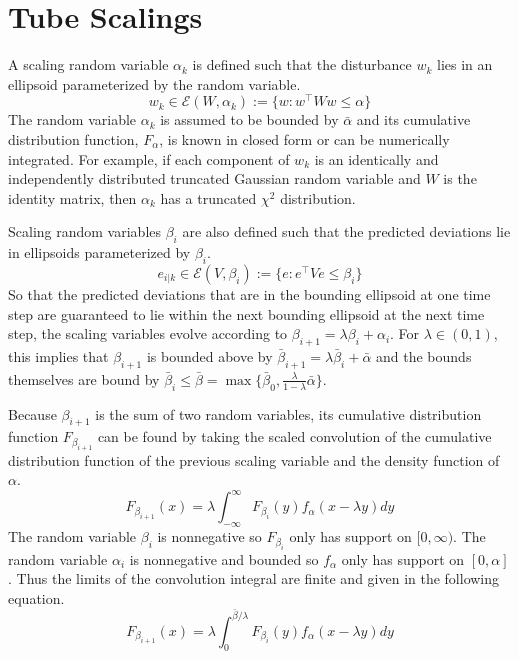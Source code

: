 \documentclass[12 pt]{report}
\begin{document}
\section{Tube Scalings}

A scaling random variable $\alpha_k$ is defined such that the disturbance $w_k$ lies in an ellipsoid parameterized by the random variable. $$w_k \in \mathcal{E}(W, \alpha_k) := \{w: w^\top Ww \leq \alpha\}$$ The random variable $\alpha_k$ is assumed to be bounded by $\bar{\alpha}$ and its cumulative distribution function, $F_\alpha$, is known in closed form or can be numerically integrated. For example, if each component of $w_k$ is an identically and independently distributed truncated Gaussian random variable and $W$ is the identity matrix, then $\alpha_k$ has a truncated $\chi^2$ distribution. 

Scaling random variables $\beta_i$ are also defined such that the predicted deviations lie in ellipsoids parameterized by $\beta_i$. $$ e_{i|k} \in \mathcal{E}(V, \beta_i) := \{e : e^\top Ve \leq \beta_i\}  $$ So that the predicted deviations that are in the bounding ellipsoid at one time step are guaranteed to lie within the next bounding ellipsoid at the next time step, the scaling variables evolve according to $ \beta_{i+1} = \lambda \beta_i + \alpha_i $. For $\lambda \in (0,1)$, this implies that $\beta_{i+1}$ is bounded above by $\bar{\beta}_{i+1} = \lambda\bar{\beta}_i + \bar{\alpha} $ and the bounds themselves are bound by $\bar{\beta}_i \leq \bar{\beta} = \max \{ \bar{\beta}_0, \frac{\lambda}{1 - \lambda} \bar{\alpha}\}$. 

Because $\beta_{i+1}$ is the sum of two random variables, its cumulative distribution function $F_{\beta_{i+1}}$ can be found by taking the scaled convolution of the cumulative distribution function of the previous scaling variable and the density function of $\alpha$. $$ F_{\beta_{i+1}}(x) = \lambda \int_{-\infty}^{\infty} F_{\beta_i}(y)f_\alpha (x-\lambda y)dy $$ The random variable $\beta_i$ is nonnegative so $F_{\beta_i}$ only has support on $[0, \infty)$. The random variable $\alpha_i$ is nonnegative and bounded so $f_\alpha$ only has support on $[0, \alpha]$. Thus the limits of the convolution integral are finite and given in the following equation. $$ F_{\beta_{i+1}}(x) = \lambda \int_{0}^{\bar{\beta}/\lambda} F_{\beta_i}(y)f_\alpha (x-\lambda y)dy $$
\end{document}
